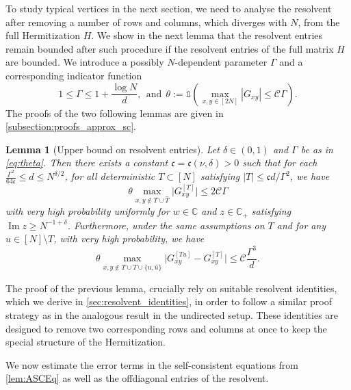 \documentclass[11pt]{article}
\DeclareMathOperator{\Ima}{Im}
\newcommand{\abs}[1]{\left| #1 \right|}
\newcommand{\absb}[1]{\bigl| #1 \bigr|}
\newcommand{\C}{\mathbb{C}}
\renewcommand{\Im}{\Ima}
\theoremstyle{plain}
\newtheorem{lemma}{Lemma}[section]
\theoremstyle{remark}
\numberwithin{equation}{section}
\newcommand*\bset[1]{[#1]}
\newcommand*\ubarr[1]{{\widehat{#1}}}
\begin{document}
	To study typical vertices in the next section, we need to analyse the resolvent after removing a number of rows and columns, which diverges with $N$, from the full Hermitization $H$.
	We show in the next lemma that the resolvent entries remain bounded after such procedure if the resolvent entries of the full matrix $H$ are bounded. 	
	We introduce a possibly $N$-dependent parameter $ \Gamma $ and a corresponding indicator function
	\begin{equation}\label{eq:theta}
		1\le \Gamma \le 1 + \frac{\log N}{d}, ~~\text{and} ~~\theta := \mathds{1}\left(\max_{x,y\in [2N]} \abs{G_{xy}}\le \mathcal C \Gamma\right) .
	\end{equation}
The proofs of the two following lemmas are given in \cref{subsection:proofs_approx_sc}.
	\begin{lemma}[Upper bound on resolvent entries] \label{lem:roughboundsGT}
	 Let $\delta \in (0,1)$ and $\Gamma$ be as in \cref{eq:theta}. 
		Then there exists a constant $\mathfrak{c}= \mathfrak{c}(\nu,\delta) >0$ such that for each $ \frac{\Gamma^2}{64 \mathfrak c} \leq d \leq N^{\delta/2}$, for all deterministic $T\subset [N]$ satisfying $\abs{T} \le \mathfrak{c}d / \Gamma^2$, we have 
		\begin{equation}\label{eq:boundGTGTu}
			\theta \max_{x,y \notin T \cup \ubarr{T}} \absb{G^{\bset{T}}_{xy}} \le 2  \mathcal C  \Gamma
		\end{equation}
		with very high probability uniformly for $w \in \C$ and $z \in \C_+$ satisfying $\Im z \geq N^{-1+\delta}$. 
		Furthermore, under the same assumptions on $T$ and for any $u \in [N] \setminus T$, with very high probability,  we have 
		\begin{equation}\label{eq:GTandGTuclose}
			\theta \max_{x,y \notin T \cup \ubarr{T} \cup \{ u, \ubarr{u}\}} \absb{G_{xy}^{\bset{Tu}} - G_{xy}^{\bset{T}}} \le \mathcal{C} \frac{\Gamma^{3}}{d}.
		\end{equation}
	\end{lemma}
	 
The proof of the previous lemma, crucially rely on suitable resolvent identities, which we derive in \cref{sec:resolvent_identities}, in order to follow a similar proof strategy as in the analogous result \cite[Lemma~4.14]{alt2021delocalization} in the undirected setup. These identities are designed to remove two corresponding 
	rows and columns at once to keep the special structure of the Hermitization.  
	

	
	We now estimate the error terms in the self-consistent equations from \cref{lem:ASCEq}
	as well as the offdiagonal entries of the resolvent. 
\end{document}
